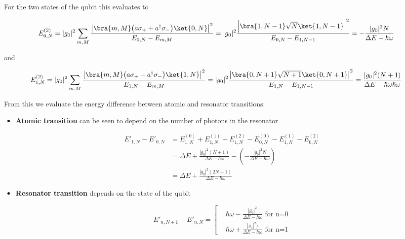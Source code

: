 \noindent  For the  two states  of the  qubit
this evaluates to

\begin{equation}\label{sec0}
  E_{0,N}^{(2)} = |g_0|^2\sum_{m,M}\frac{\left|\bra{m,M}\big(a\sigma_{+}+a^{\dagger}\sigma_{-}\big)\ket{0,N}\right|^2}{E_{0,N}-E_{m,M}}= |g_0|^2\frac{\left|\bra{1,N-1}\sqrt{N}\ket{1,N-1}\right|^2}{E_{0,N}-E_{1,N-1}} = -\frac{|g_0|^2N}{\Delta E - \hbar\omega}
\end{equation}

\noindent and

\begin{equation}\label{sec1}
  E_{1,N}^{(2)} = |g_0|^2\sum_{m,M}\frac{\left|\bra{m,M}\big({a\sigma_{+}}+a^{\dagger}\sigma_{-}\big)\ket{1,N}\right|^2}{E_{1,N}-E_{m,M}}= |g_0|^2\frac{\left|\bra{0,N+1}\sqrt{N+1}\ket{0,N+1}\right|^2}{E_{1,N}-E_{1,N-1}} = \frac{|g_0|^2(N+1)}{\Delta E - \hbar\omega \hbar\omega}
\end{equation}

\noindent  From this  we evaluate  the energy
difference   between  atomic   and  resonator
transitions:

\begin{itemize}
\item \textbf{Atomic transition}  can be seen
  to depend  on the number of  photons in the
  resonator

  \begin{equation}\label{secAtom}\begin{aligned}
      E'_{1,N}-E'_{0,N}  & =  E_{1,N}^{(0)} +
      E_{1,N}^{(1)}    +   E_{1,N}^{(2)}    -
      E_{0,N}^{(0)}    -   E_{1,N}^{(1)}    -
      E_{0,N}^{(2)}    \\&    =   \Delta    E    +
      \frac{|g_0|^2(N+1)}{\Delta E  - \hbar\omega}
      -      (-\frac{|g_0|^2N}{\Delta     E      -
        \hbar\omega})\\&         =         {\Delta
        E+\frac{|g_0|^2(2N+1)}{\Delta      E     -
          \hbar\omega}}
    \end{aligned}
  \end{equation}
\item  \textbf{Resonator transition}  depends
  on the state of the qubit

  \begin{equation}\label{secRes}
    E'_{n,N+1}-E'_{n,N} = \left[\begin{aligned}
        & \hbar\omega  -\frac{|g_0|^2}{\Delta E -  \hbar\omega} \text{ for n=0}
        \\&  \hbar\omega + {\frac{|g_0|^2)}{\Delta E -  \hbar\omega}}\text{ for n=1}
      \end{aligned}\right.
  \end{equation}
\end{itemize}

